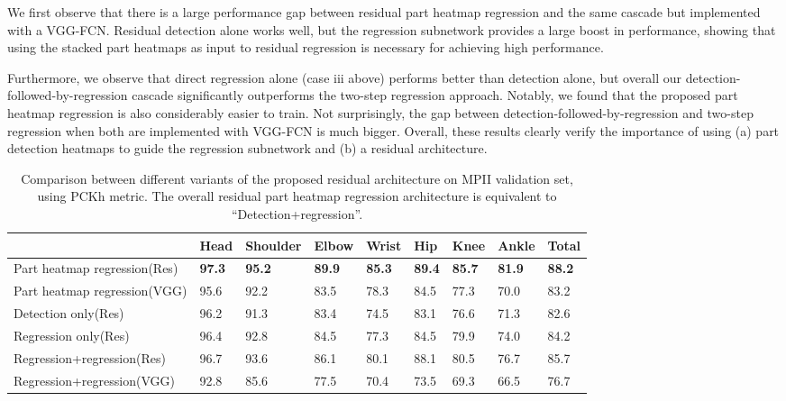 \documentclass[runningheads]{llncs}
\begin{document}
We first observe that there is a large performance gap between residual part heatmap regression and the same cascade but implemented with a VGG-FCN. Residual detection alone works well, but the regression subnetwork provides a large boost in performance, showing that using the stacked part heatmaps as input to residual regression is necessary for achieving high performance. 

Furthermore, we observe that direct regression alone (case iii above) performs better than detection alone, but overall our detection-followed-by-regression cascade significantly outperforms the two-step regression approach. Notably, we found that the proposed part heatmap regression is also considerably easier to train. Not surprisingly, the gap between detection-followed-by-regression and two-step regression when both are implemented with VGG-FCN is much bigger. Overall, these results clearly verify the importance of using (a) part detection heatmaps to guide the regression subnetwork and (b) a residual architecture.


\setlength{\tabcolsep}{2pt}
\begin{table}
	\begin{center}
		\caption{Comparison between different variants of the proposed residual architecture on MPII validation set, using PCKh metric. The overall residual part heatmap regression architecture is equivalent to ``Detection+regression''.}
		\label{table:OursCompMPIIDet}
		\begin{tabular}{lllllllll}
			&Head & Shoulder & Elbow & Wrist & Hip & Knee  & Ankle & Total \\
            \hline
		Part heatmap regression(Res)& \textbf{97.3}  & \textbf{95.2}  & \textbf{89.9}  & \textbf{85.3}  & \textbf{89.4}  & \textbf{85.7} & \textbf{81.9} & \textbf{88.2} \\	
            Part heatmap regression(VGG) & 95.6  & 92.2  & 83.5  & 78.3  & 84.5  & 77.3 & 70.0 & 83.2 \\ \hline        	           
			Detection only(Res) & 96.2  & 91.3  & 83.4  & 74.5  & 83.1  & 76.6 & 71.3 & 82.6\\
                        Regression only(Res) & 96.4  & 92.8  & 84.5  & 77.3  & 84.5  & 79.9 & 74.0 & 84.2 \\
            Regression+regression(Res) & 96.7  & 93.6  & 86.1  & 80.1  & 88.1  & 80.5 & 76.7 & 85.7 \\ 
            Regression+regression(VGG) & 92.8  & 85.6  & 77.5  & 70.4  & 73.5  & 69.3 & 66.5 & 76.7 \\
            \hline
		\end{tabular}
	\end{center}
\end{table}
\setlength{\tabcolsep}{1.4pt}
\end{document}
